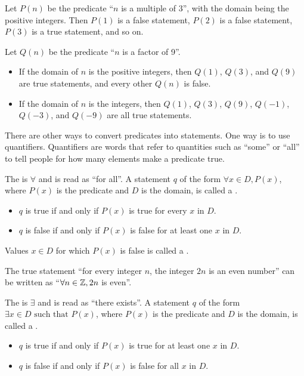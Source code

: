 \begin{example}
    Let $P(n)$ be the predicate ``$n$ is a multiple of 3'', with the domain being the positive integers. Then $P(1)$ is a false statement, $P(2)$ is a false statement, $P(3)$ is a true statement, and so on.
\end{example}

\begin{example}
    Let $Q(n)$ be the predicate ``$n$ is a factor of 9''.
    \begin{itemize}
        \item If the domain of $n$ is the positive integers, then $Q(1)$, $Q(3)$, and $Q(9)$ are true statements, and every other $Q(n)$ is false.
        \item If the domain of $n$ is the integers, then $Q(1)$, $Q(3)$, $Q(9)$, $Q(-1)$, $Q(-3)$, and $Q(-9)$ are all true statements.
    \end{itemize}
\end{example}

There are other ways to convert predicates into statements. One way is to use quantifiers. Quantifiers are words that refer to quantities such as ``some'' or ``all'' to tell people for how many elements make a predicate true.

\begin{definition}
    The  is $\forall$ and is read as ``for all''. A statement $q$ of the form $\forall x \in D, P(x)$, where $P(x)$ is the predicate and $D$ is the domain, is called a .
    \begin{itemize}
        \item $q$ is true if and only if $P(x)$ is true for every $x$ in $D$.
        \item $q$ is false if and only if $P(x)$ is false for at least one $x$ in $D$.
    \end{itemize}
    Values $x \in D$ for which $P(x)$ is false is called a .
\end{definition}

\begin{example}
    The true statement ``for every integer $n$, the integer $2n$ is an even number'' can be written as ``$\forall n \in \mathbb{Z}, 2n$ is even''.
\end{example}

\begin{definition}
    The  is $\exists$ and is read as ``there exists''. A statement $q$ of the form $\exists x \in D \textrm{ such that } P(x)$, where $P(x)$ is the predicate and $D$ is the domain, is called a .
    \begin{itemize}
        \item $q$ is true if and only if $P(x)$ is true for at least one $x$ in $D$.
        \item $q$ is false if and only if $P(x)$ is false for all $x$ in $D$.
    \end{itemize}
\end{definition}

